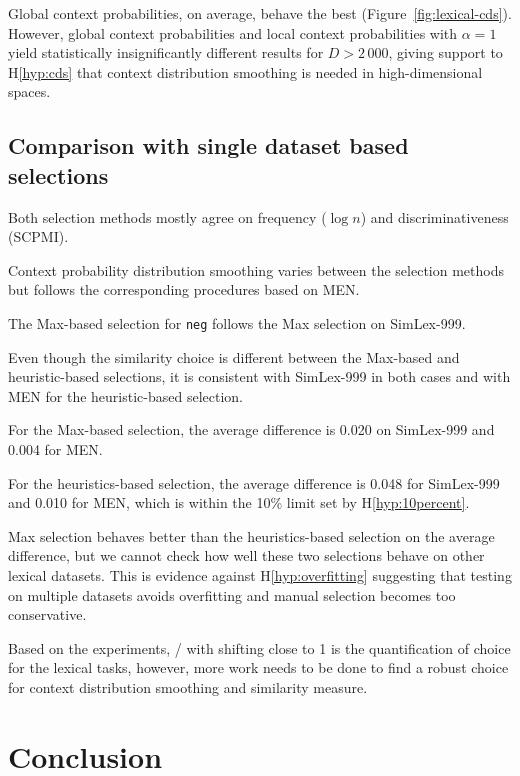  Global context probabilities, on average, behave the best (Figure~\ref{fig:lexical-cds}). However, global context probabilities and local context probabilities with $\alpha = 1$ yield statistically insignificantly different results for $D > 2\,000$, giving support to H\ref{hyp:cds} that context distribution smoothing is needed in high-dimensional spaces.

\subsection{Comparison with single dataset based selections}

Both selection methods mostly agree on frequency ($\log n$) and discriminativeness (SCPMI).

Context probability distribution smoothing varies between the selection methods but follows the corresponding procedures based on MEN.

The Max-based selection for \texttt{neg} follows the Max selection on SimLex-999.

Even though the similarity choice is different between the Max-based and heuristic-based selections, it is consistent with SimLex-999 in both cases and with MEN for the heuristic-based selection.

For the Max-based selection, the average difference is 0.020 on SimLex-999 and 0.004 for MEN.

For the heuristics-based selection, the average difference is 0.048 for SimLex-999 and 0.010 for MEN, which is within the 10\% limit set by H\ref{hyp:10percent}.

Max selection behaves better than the heuristics-based selection on the average difference, but we cannot check how well these two selections behave on other lexical datasets. This is evidence against H\ref{hyp:overfitting} suggesting that testing on multiple datasets avoids overfitting and manual selection becomes too conservative.

Based on the experiments, \logNSCPMI/ with shifting close to 1 is the quantification of choice for the lexical tasks, however, more work needs to be done to find a robust choice for context distribution smoothing and similarity measure.

\section{Conclusion}
\label{sec:conclusion-lexical}

